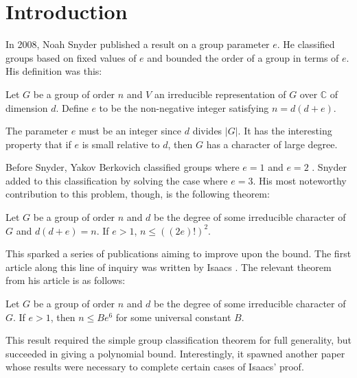 \documentclass[main.tex]{subfiles}
\begin{document}
\chapter{Introduction}

In 2008, Noah Snyder \cite{snyderarticle} published a result on a group parameter $e$. He classified groups based on fixed values of $e$ and bounded the order of a group in terms of $e$. His definition was this:

\hss

\begin{definition}
Let $G$ be a group of order $n$ and $V$ an irreducible representation of $G$ over $\mathbb{C}$ of dimension $d$. Define $e$ to be the non-negative integer satisfying $n = d(d + e)$.
\end{definition}

\hss

The parameter $e$ must be an integer since $d$ divides $|G|$. It has the interesting property that if $e$ is small relative to $d$, then $G$ has a character of large degree.

Before Snyder, Yakov Berkovich classified groups where $e=1$ and $e=2$ \cite{berkovicharticle}. Snyder added to this classification by solving the case where $e=3$. His most noteworthy contribution to this problem, though, is the following theorem:

\hss

\begin{theorem}
Let $G$ be a group of order $n$ and $d$ be the degree of some irreducible character of $G$ and $d(d+e) = n$. If $e > 1$, $n \le ((2e)!)^2$.
\end{theorem}

\hss

This sparked a series of publications aiming to improve upon the bound. The first article along this line of inquiry was written by Isaacs \cite{isaacsarticle}. The relevant theorem from his article is as follows:

\hss

\begin{theorem} Let $G$ be a group of order $n$ and $d$ be the degree of some irreducible character of $G$. If $e > 1$, then $n \le Be^6$ for some universal constant $B$.
\end{theorem}

\hss

This result required the simple group classification theorem for full generality, but succeeded in giving a polynomial bound. Interestingly, it spawned another paper \cite{larsenmalletieparticle} whose results were necessary to complete certain cases of Isaacs' proof.
\end{document}
